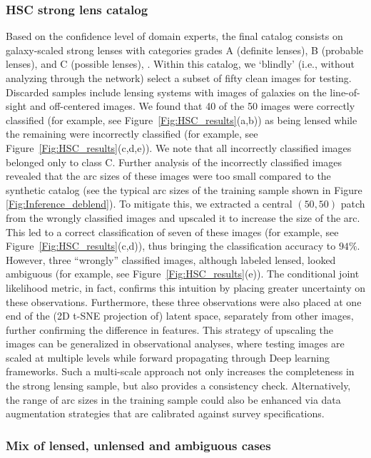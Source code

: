 \documentclass[12pt, twocolumn, apj]{openjournal}
\begin{document}
\subsubsection{HSC strong lens catalog}
Based on the confidence level of domain experts, the final catalog consists on galaxy-scaled strong lenses with categories grades A (definite lenses), B (probable lenses), and C (possible lenses), \citep{hsc2_wong}. Within this catalog, we `blindly' (i.e., without analyzing through the network) select a subset of fifty clean images for testing. Discarded samples include lensing systems with images of galaxies on the line-of-sight and off-centered images.
We found that 40 of the 50 images were correctly classified (for example, see Figure~\ref{Fig:HSC_results}(a,b)) as being lensed while the remaining were incorrectly classified (for example, see Figure~\ref{Fig:HSC_results}(c,d,e)). We note that all incorrectly classified images belonged only to class C. Further analysis of the incorrectly classified images revealed that the arc sizes 
of these images were too small compared to the synthetic catalog (see the typical arc sizes of the training sample shown in Figure \ref{Fig:Inference_deblend}). To mitigate this, we extracted a central $(50,50)$ patch from the wrongly classified images and upscaled it to increase the size of the arc. This led to a correct classification of seven of these images (for example, see Figure~\ref{Fig:HSC_results}(c,d)), thus bringing the classification accuracy to $94\%$. However, three ``wrongly'' classified images, although labeled lensed, looked ambiguous (for example, see Figure~\ref{Fig:HSC_results}(e)). The conditional joint likelihood metric, in fact, confirms this intuition by placing greater uncertainty on these observations. Furthermore, these three observations were also placed at one end of the (2D t-SNE projection of) latent space, separately from other images, further confirming the difference in features. This strategy of upscaling the images can be generalized in observational analyses, where testing images are scaled at multiple levels while forward propagating through Deep learning frameworks. Such a multi-scale approach not only increases the completeness in the strong lensing sample, but also provides a consistency check. Alternatively, the range of arc sizes in the training sample could also be enhanced via data augmentation strategies that are calibrated against survey specifications.

\subsubsection{Mix of lensed, unlensed and ambiguous cases}
\end{document}
